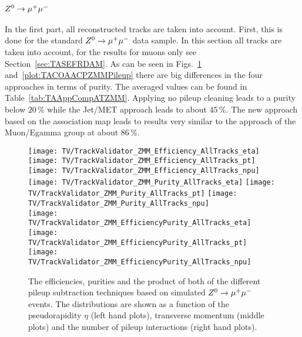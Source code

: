 \subsubsection{$\Zz\rightarrow\MM$ \label{sec:TASEFRDACPZMM}}
In the first part, all reconstructed tracks are taken into account. First, this is done for the standard $\Zz\rightarrow\MM$ data sample. In this section all tracks are taken into account, for the results for muons only see Section~\ref{sec:TASEFRDAM}. As can be seen in Figs.~\ref{plot:TACOAACPZMMSignal} and~\ref{plot:TACOAACPZMMPileup} there are big differences in the four approaches in terms of purity. The averaged values can be found in Table~\ref{tab:TAAppCompATZMM}. Applying no pileup cleaning leads to a purity below $20\,\%$ while the Jet/MET approach leads to about $45\,\%$. The new approach based on the association map leads to results very similar to the approach of the Muon/Egamma group at about $86\,\%$.



\begin{figure}[Ht]
    \centering
    \texttt{[image: TV/TrackValidator\_ZMM\_Efficiency\_AllTracks\_eta]}
    \texttt{[image: TV/TrackValidator\_ZMM\_Efficiency\_AllTracks\_pt]}
    \texttt{[image: TV/TrackValidator\_ZMM\_Efficiency\_AllTracks\_npu]}
    \\
    \texttt{[image: TV/TrackValidator\_ZMM\_Purity\_AllTracks\_eta]}
    \texttt{[image: TV/TrackValidator\_ZMM\_Purity\_AllTracks\_pt]}
    \texttt{[image: TV/TrackValidator\_ZMM\_Purity\_AllTracks\_npu]}
    \\
    \texttt{[image: TV/TrackValidator\_ZMM\_EfficiencyPurity\_AllTracks\_eta]}
    \texttt{[image: TV/TrackValidator\_ZMM\_EfficiencyPurity\_AllTracks\_pt]}
    \texttt{[image: TV/TrackValidator\_ZMM\_EfficiencyPurity\_AllTracks\_npu]}
    \caption[Efficiencies, purities and their product of the different pileup subtraction techniques based on simulated $\Zz\rightarrow\MM$ events]{The efficiencies, purities and the product of both of the different pileup subtraction techniques based on simulated $\Zz\rightarrow\MM$ events. The distributions are shown as a function of the pseudorapidity $\eta$ (left hand plots), transverse momentum (middle plots) and the number of pileup interactions (right hand plots). \label{plot:TACOAACPZMMSignal}}
\end{figure}

